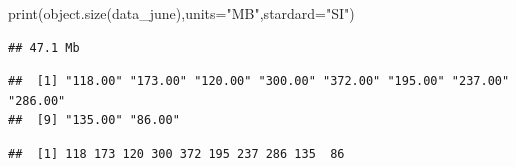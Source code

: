 \documentclass[
]{article}
\newenvironment{Shaded}{\begin{snugshade}}{\end{snugshade}}
\newcommand{\AttributeTok}[1]{\textcolor[rgb]{0.77,0.63,0.00}{#1}}
\newcommand{\CommentTok}[1]{\textcolor[rgb]{0.56,0.35,0.01}{\textit{#1}}}
\newcommand{\DecValTok}[1]{\textcolor[rgb]{0.00,0.00,0.81}{#1}}
\newcommand{\FunctionTok}[1]{\textcolor[rgb]{0.00,0.00,0.00}{#1}}
\newcommand{\NormalTok}[1]{#1}
\newcommand{\OtherTok}[1]{\textcolor[rgb]{0.56,0.35,0.01}{#1}}
\newcommand{\SpecialCharTok}[1]{\textcolor[rgb]{0.00,0.00,0.00}{#1}}
\newcommand{\StringTok}[1]{\textcolor[rgb]{0.31,0.60,0.02}{#1}}
\begin{document}
\begin{Shaded}
\begin{Highlighting}[]
\FunctionTok{print}\NormalTok{(}\FunctionTok{object.size}\NormalTok{(data\_june),}\AttributeTok{units=}\StringTok{"MB"}\NormalTok{,}\AttributeTok{stardard=}\StringTok{"SI"}\NormalTok{)}
\end{Highlighting}
\end{Shaded}

\begin{verbatim}
## 47.1 Mb
\end{verbatim}

\begin{Shaded}
\end{Shaded}

\begin{verbatim}
##  [1] "118.00" "173.00" "120.00" "300.00" "372.00" "195.00" "237.00" "286.00"
##  [9] "135.00" "86.00"
\end{verbatim}

\begin{Shaded}
\end{Shaded}

\begin{verbatim}
##  [1] 118 173 120 300 372 195 237 286 135  86
\end{verbatim}

\begin{Shaded}
\end{Shaded}
\end{document}
